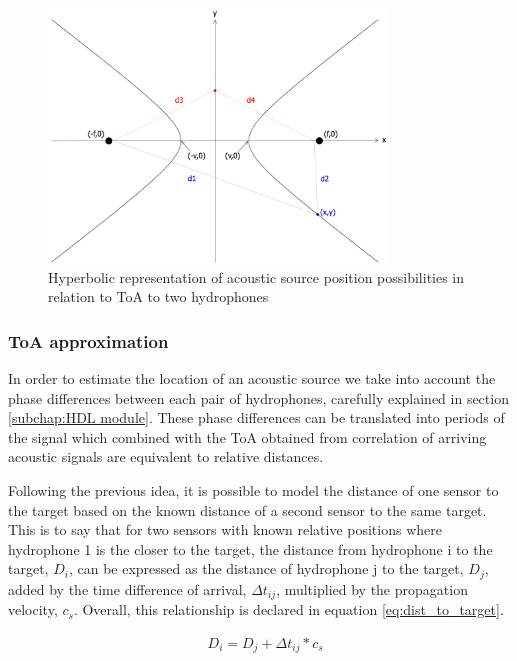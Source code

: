 \begin{figure}[!htbp]
	\centering
	\includegraphics[width=0.8\textwidth]{figures/hyperbole-dist}
	\captionsetup{justification=centering,margin=2cm}
	\caption{Hyperbolic representation of acoustic source position possibilities in relation to ToA to two hydrophones}
	\label{fig:hyper}
\end{figure}

\subsubsection{ToA approximation}

In order to estimate the location of an acoustic source we take into account the phase differences between each pair of hydrophones, carefully explained in section \ref{subchap:HDL module}. These phase differences can be translated into periods of the signal which combined with the ToA obtained from correlation of arriving acoustic signals are equivalent to relative distances.

Following the previous idea, it is possible to model the distance of one sensor to the target based on the known distance of a second sensor to the same target. 
This is to say that for two sensors with known relative positions where hydrophone 1 is the closer to the target, the distance from hydrophone i to the target, $D_i$, can be expressed as the distance of hydrophone j to the target, $D_j$, added by the time difference of arrival, $\Delta t_{ij}$, multiplied by the propagation velocity, $c_s$. Overall, this relationship is declared in equation \ref{eq:dist_to_target}.

\begin{eqnarray}
& D_i = D_j + \Delta t_{ij} * c_s
\label{eq:dist_to_target}
\end{eqnarray}

